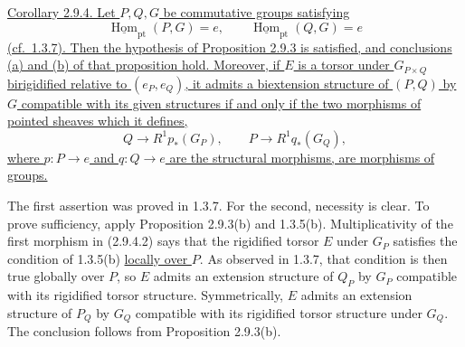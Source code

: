 
\underline{Corollary 2.9.4. Let $P,Q,G$ be commutative groups
satisfying}
\begin{equation}\tag{2.9.4.1}
 \underline{\operatorname{Hom}}_{\mathrm{pt}}(P,G)=e,
 \qquad
 \underline{\operatorname{Hom}}_{\mathrm{pt}}(Q,G)=e
\end{equation}
\underline{(cf.\ 1.3.7). Then the hypothesis of Proposition 2.9.3 is
satisfied, and conclusions (a) and (b) of that proposition hold.
Moreover, if $E$ is a torsor under $G_{P\times Q}$ birigidified
relative to $(e_P,e_Q)$, it admits a biextension structure of $(P,Q)$
by $G$ compatible with its given structures if and only if the two
morphisms of pointed sheaves which it defines,}
\begin{equation}\tag{2.9.4.2}
 Q\longrightarrow R^1p_*(G_P),
 \qquad
 P\longrightarrow R^1q_*(G_Q),
\end{equation}
\underline{where $p:P\longrightarrow e$ and $q:Q\longrightarrow e$
are the structural morphisms, are morphisms of groups.}

The first assertion was proved in 1.3.7. For the second, necessity is
clear. To prove sufficiency, apply Proposition 2.9.3(b) and 1.3.5(b).
Multiplicativity of the first morphism in (2.9.4.2) says that the
rigidified torsor $E$ under $G_P$ satisfies the condition of 1.3.5(b)
\underline{locally over $P$}. As observed in 1.3.7, that condition is
then true globally over $P$, so $E$ admits an extension structure of
$Q_P$ by $G_P$ compatible with its rigidified torsor structure.
Symmetrically, $E$ admits an extension structure of $P_Q$ by $G_Q$
compatible with its rigidified torsor structure under $G_Q$. The
conclusion follows from Proposition 2.9.3(b).

